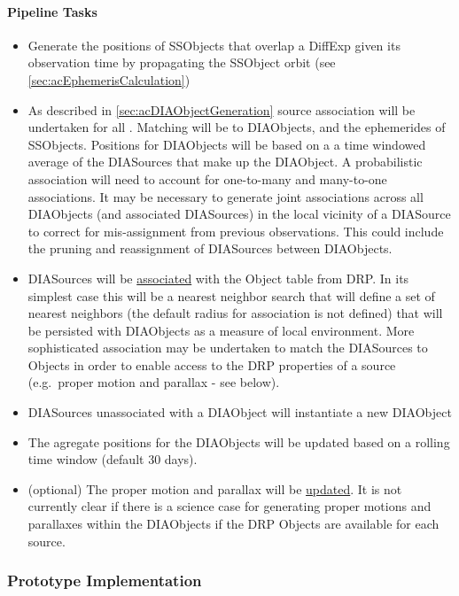 \paragraph{Pipeline Tasks}
\begin{itemize}
\item Generate the positions of SSObjects that overlap a DiffExp given its observation time by propagating the SSObject orbit (see \ref{sec:acEphemerisCalculation}) 
\item As described in \ref{sec:acDIAObjectGeneration} source association will be undertaken for all \DIASources. Matching will be to DIAObjects, and the ephemerides of SSObjects. Positions for DIAObjects will be based on a a time windowed average of the DIASources that make up the DIAObject. A probabilistic association will need to account for one-to-many and many-to-one associations. It may be necessary to generate joint associations across all DIAObjects (and associated DIASources) in the local  vicinity of a DIASource to correct for mis-assignment from previous observations. This could include the pruning and reassignment of DIASources between DIAObjects.
\item DIASources will be \hyperref[sec:acDIAObjectGeneration]{associated} with the Object table from DRP. In its simplest case this will be a nearest neighbor search that will define a set of nearest neighbors (the default radius for association is not defined) that will be persisted with DIAObjects as a measure of local environment. More sophisticated association may be undertaken to match the DIASources to Objects in order to enable access to the DRP properties of a source (e.g.\ proper motion and parallax - see below).
\item DIASources unassociated with a DIAObject will instantiate a new DIAObject
\item The agregate positions for the DIAObjects will be updated based on a rolling time window (default 30 days). 
\item (optional) The proper motion and parallax will be \hyperref[sec:acStellarMotionFitting]{updated}. It is not currently clear if there is a science case for generating proper motions and parallaxes within the DIAObjects if the DRP Objects are available for each source. 
\end{itemize}


\subsubsection{Prototype Implementation}

